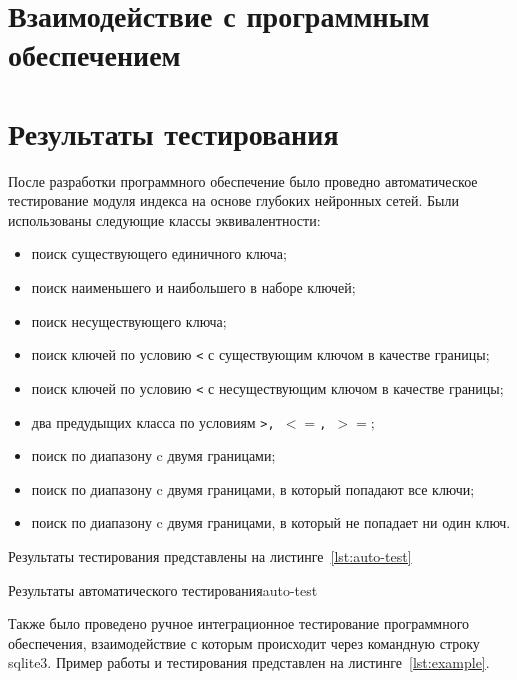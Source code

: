 
\section{Взаимодействие с программным обеспечением}



\section{Результаты тестирования}

После разработки программного обеспечение было проведно автоматическое
тестирование модуля индекса на основе глубоких нейронных сетей. Были
использованы следующие классы эквивалентности:

\begin{itemize}
    \item поиск существующего единичного ключа;
    \item поиск наименьшего и наибольшего в наборе ключей;
    \item поиск несуществующего ключа;
    \item поиск ключей по условию \texttt{<} с существующим ключом в качестве
        границы;
    \item поиск ключей по условию \texttt{<} с несуществующим ключом в качестве
        границы;
    \item два предудыщих класса по условиям \texttt{>, $<=$, $>=$};
    \item поиск по диапазону c двумя границами;
    \item поиск по диапазону c двумя границами, в который попадают все ключи;
    \item поиск по диапазону c двумя границами, в который не попадает ни один
        ключ.
\end{itemize}

Результаты тестирования представлены на листинге~\ref{lst:auto-test}

{}{Результаты автоматического тестирования}{auto-test}{}

Также было проведено ручное интеграционное тестирование программного
обеспечения, взаимодействие с которым происходит через командную строку sqlite3.
Пример работы и тестирования представлен на листинге~\ref{lst:example}.


